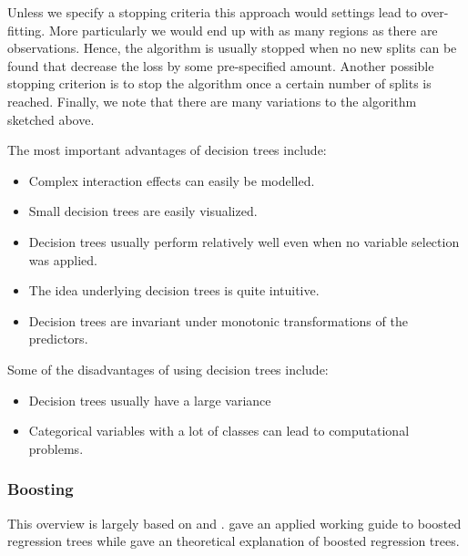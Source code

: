 Unless we specify a stopping criteria this approach would settings lead to over-fitting. More particularly we would end up with as many regions as there are observations. Hence, the algorithm is usually stopped when no new splits can be found that decrease the loss by some pre-specified amount. Another possible stopping criterion is to stop the algorithm once a certain number of splits is reached. Finally, we note that there are many variations to the algorithm sketched above.


The most important advantages of decision trees include:
\begin{itemize}
\item Complex interaction effects can easily be modelled.
\item Small decision trees are easily visualized.
\item Decision trees usually perform relatively well even when no variable selection was applied.
\item The idea underlying decision trees is quite intuitive.
\item Decision trees are invariant under monotonic transformations of the predictors.
\end{itemize}

Some of the disadvantages of using decision trees include:
\begin{itemize}
\item Decision trees usually have a large variance
\item Categorical variables with a lot of classes can lead to computational problems.
\end{itemize}

\subsubsection{Boosting}
\label{sec:Boosting}
This overview is largely based on \cite{elith_working_2008} and \cite{friedman_additive_2000}. \cite{elith_working_2008} gave an applied working guide to boosted regression trees while \cite{friedman_additive_2000} gave an theoretical explanation of boosted regression trees.\\

